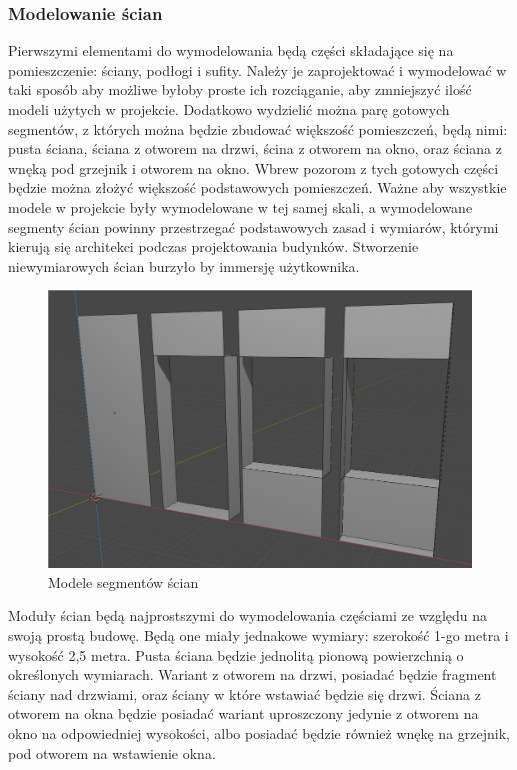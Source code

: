 \documentclass{article} %
\begin{document}
        \subsubsection{Modelowanie ścian}
            Pierwszymi elementami do wymodelowania będą części składające się na pomieszczenie: ściany, podłogi i sufity. Należy je zaprojektować i wymodelować w taki sposób aby możliwe byłoby proste ich rozciąganie, aby zmniejszyć ilość modeli użytych w projekcie. Dodatkowo wydzielić można parę gotowych segmentów, z których można będzie zbudować większość pomieszczeń, będą nimi: pusta ściana, ściana z otworem na drzwi, ścina z otworem na okno, oraz ściana z wnęką pod grzejnik i otworem na okno. Wbrew pozorom z tych gotowych części będzie można złożyć większość podstawowych pomieszczeń. Ważne aby wszystkie modele w projekcie były wymodelowane w tej samej skali, a wymodelowane segmenty ścian powinny przestrzegać podstawowych zasad i wymiarów, którymi kierują się architekci podczas projektowania budynków. Stworzenie niewymiarowych ścian burzyło by immersję użytkownika.
            \\
            
            
            \begin{figure}
            \centering
            \includegraphics[scale=0.3]{images/screenshots/work/work.png}
            \caption{Modele segmentów ścian}
            \label{Tab.}
            \end{figure}


            
            Moduły ścian będą najprostszymi do wymodelowania częściami ze względu na swoją prostą budowę. Będą one miały jednakowe wymiary: szerokość 1-go metra i wysokość 2,5 metra. Pusta ściana będzie jednolitą pionową powierzchnią o określonych wymiarach. Wariant z otworem na drzwi, posiadać będzie fragment ściany nad drzwiami, oraz ściany w które wstawiać będzie się drzwi. Ściana z otworem na okna będzie posiadać wariant uproszczony jedynie z otworem na okno na odpowiedniej wysokości, albo posiadać będzie również wnękę na grzejnik, pod otworem na wstawienie okna.
            \\
            
\end{document}
